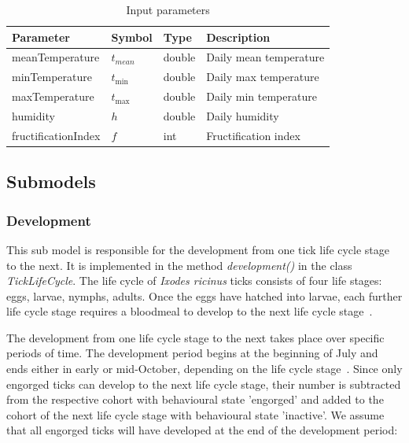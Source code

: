 \documentclass[a4paper, 11pt]{scrartcl}
\begin{document}
\begin{table}[h!]
\caption{Input parameters}
\label{tab:input_parameters}
\begin{tabularx}{\textwidth}{llll}
\toprule
\textbf{Parameter} & \textbf{Symbol} & \textbf{Type}     & \textbf{Description}       \\
\midrule
meanTemperature    & $t_{mean}$      & double            & Daily mean temperature     \\
minTemperature     & $t_{\min}$      & double            & Daily max temperature      \\
maxTemperature     & $t_{\max}$      & double            & Daily min temperature      \\
humidity           & $h$             & double            & Daily humidity             \\
\midrule
fructificationIndex & $f$            & int               & Fructification index       \\
\bottomrule
\end{tabularx}
\end{table}


\newpage
\subsection{Submodels}\label{submodels}

\subsubsection{Development}
This sub model is responsible for the development from one tick life cycle stage to the next. It is implemented in the method \textit{development()} in the class \textit{TickLifeCycle}. The life cycle of \textit{Ixodes ricinus} ticks consists of four life stages: eggs, larvae, nymphs, adults. Once the eggs have hatched into larvae, each further life cycle stage requires a bloodmeal to develop to the next life cycle stage~\parencite{tba}.

The development from one life cycle stage to the next takes place over specific periods of time. The development period begins at the beginning of July and ends either in early or mid-October, depending on the life cycle stage~\parencite{tba}. Since only engorged ticks can develop to the next life cycle stage, their number is subtracted from the respective cohort with behavioural state 'engorged' and added to the cohort of the next life cycle stage with behavioural state 'inactive'. We assume that all engorged ticks will have developed at the end of the development period:
\end{document}
